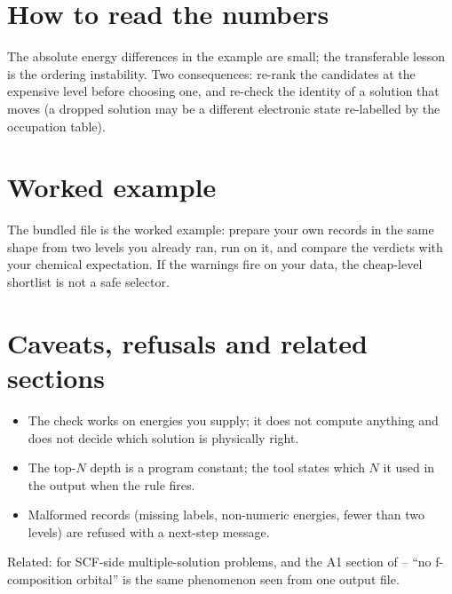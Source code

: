 \section{How to read the numbers}

\begin{readbox}
The absolute energy differences in the example are small; the transferable
lesson is the ordering instability. Two consequences: re-rank the candidates at
the expensive level before choosing one, and re-check the identity of a
solution that moves (a dropped solution may be a different electronic state
re-labelled by the occupation table).
\end{readbox}

\section{Worked example}

The bundled file  is the worked
example: prepare your own records in the same shape from two levels you
already ran, run  on it, and compare the verdicts with your chemical
expectation. If the warnings fire on your data, the cheap-level shortlist is
not a safe selector.

\section{Caveats, refusals and related sections}

\begin{refusalbox}
\begin{itemize}
  \item The check works on energies you supply; it does not compute anything
    and does not decide which solution is physically right.
  \item The top-$N$ depth is a program constant; the tool states which $N$ it
    used in the output when the rule fires.
  \item Malformed records (missing labels, non-numeric energies, fewer than
    two levels) are refused with a next-step message.
\end{itemize}
\end{refusalbox}

Related:  for SCF-side multiple-solution problems, and the A1 section
of  -- ``no f-composition orbital'' is the same phenomenon seen from
one output file.
